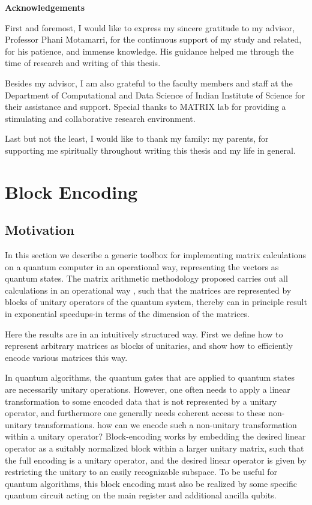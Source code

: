 \documentclass[12pt, oneside]{book}
\theoremstyle{definition}
\theoremstyle{definition}
\theoremstyle{remark}
\newcommand{\acknowledgementsname}{Acknowledgements}
\newenvironment{Acknowledgements}{%
\clearpage
\null\vfill
\begin{center}%
    \bfseries \acknowledgementsname
\end{center}}%
{\vfill\null}
\begin{document}
\begin{Acknowledgements}
First and foremost, I would like to express my sincere gratitude to my advisor,
Professor Phani Motamarri, for the continuous support of my study and related, for
his patience, and immense knowledge.
His guidance helped me through the time of research and writing of this thesis.

Besides my advisor, I am also grateful to the faculty members and staff at the
Department of Computational and Data Science of Indian Institute of Science for
their assistance and support. Special thanks to MATRIX lab for providing a stimulating
and collaborative research environment.

Last but not the least, I would like to thank my family: my parents,
for supporting me spiritually throughout writing this thesis and my life in general.
\end{Acknowledgements}

\tableofcontents

\mainmatter

\chapter{Block Encoding}
\section{Motivation}
In this section we describe a generic toolbox for implementing matrix calculations on a quantum computer in an operational way, representing the vectors as quantum states. The matrix arithmetic methodology proposed carries out all calculations in an operational way , such that the matrices are represented by blocks of unitary operators of the quantum system, thereby can in principle result in exponential speedups-in terms of the dimension of the matrices.

Here the results are in an intuitively structured way. First we define how to represent arbitrary matrices as blocks of unitaries, and show how to efficiently encode various matrices this way.

In quantum algorithms, the quantum gates that are applied to quantum states are necessarily unitary operations. However, one often needs to apply a linear transformation to some encoded data that is not represented by a unitary operator, and furthermore one generally needs coherent access to these non-unitary transformations. how can we encode such a non-unitary transformation within a unitary operator? Block-encoding works by embedding the desired linear operator as a suitably normalized block within a larger unitary matrix, such that the full encoding is a unitary operator, and the desired linear operator is given by restricting the unitary to an easily recognizable subspace. To be useful for quantum algorithms, this block encoding must also be realized by some specific quantum circuit acting on the main register and additional ancilla qubits.
\end{document}
